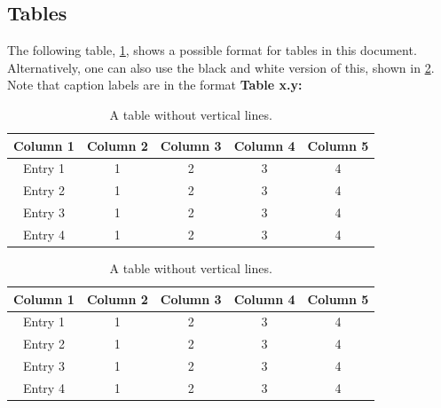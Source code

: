 \documentclass[a4paper, table]{article}
\begin{document}
\subsection{Tables}
The following table, \cref{table: style 1}, shows a possible format for tables in this document. Alternatively, one can also use the black and white version of this, shown in \cref{table: style 2}. Note that caption labels are in the format \textbf{\textcolor{Tue-red}{Table x.y:} }

\begin{table}[ht]
    \centering
    \caption{A table without vertical lines.}
    \begin{tabular}[t]{ccccc}
        \toprule
        \color{Tue-red}\textbf{Column 1}&\color{Tue-red}\textbf{Column 2}&\color{Tue-red}\textbf{Column 3}&\color{Tue-red}\textbf{Column 4}&\color{Tue-red}\textbf{Column 5}\\
        \midrule
        Entry 1&1&2&3&4\\
        Entry 2&1&2&3&4\\
        Entry 3&1&2&3&4\\
        Entry 4&1&2&3&4\\
        \bottomrule
    \end{tabular}
    \label{table: style 1}
\end{table}

\begin{table}[ht]
    \centering
    \caption{A table without vertical lines.}
    \begin{tabular}[t]{ccccc}
        \toprule
        \textbf{Column 1}&\textbf{Column 2}&\textbf{Column 3}&\textbf{Column 4}&\textbf{Column 5}\\
        \midrule
        Entry 1&1&2&3&4\\
        Entry 2&1&2&3&4\\
        Entry 3&1&2&3&4\\
        Entry 4&1&2&3&4\\
        \bottomrule
    \end{tabular}
    \label{table: style 2}
\end{table}


\end{document}
